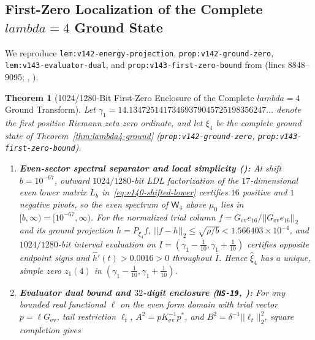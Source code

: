 \documentclass[11pt]{article}
\def\lambda{lambda}%
\def\norm#1{||#1||}%
\newtheorem{theorem}{Theorem}[section]
\theoremstyle{remark}
\newcommand{\norm}[1]{\left\lVert #1\right\rVert}
\begin{document}
\subsection{First-Zero Localization of the Complete \texorpdfstring{$\lambda = 4$}{lambda = 4} Ground State}
We reproduce \texttt{lem:v142-\allowbreak energy-\allowbreak projection}, \texttt{prop:v142-\allowbreak ground-\allowbreak zero}, \texttt{lem:v143-\allowbreak evaluator-\allowbreak dual}, and \texttt{prop:v143-\allowbreak first-\allowbreak zero-\allowbreak bound} from  (lines 8848--9095; , ).

\begin{theorem}[1024/1280-Bit First-Zero Enclosure of the Complete $\lambda = 4$ Ground Transform]
\label{thm:first-zero-enclosure}
Let $\gamma_1 = 14.13472514173469379045725198356247\dots$ denote the first positive Riemann zeta zero ordinate, and let $\xi_4$ be the complete ground state of Theorem~\ref{thm:lambda4-ground} (\texttt{prop:v142-ground-zero}, \texttt{prop:v143-first-zero-bound}).
\begin{enumerate}[label=(\alph*)]
  \item \textbf{Even-sector spectral separator and local simplicity ():} At shift $b = 10^{-67}$, outward $1024/1280$-bit LDL factorization of the $17$-dimensional even lower matrix $L_b$ in~\eqref{eq:v140-shifted-lower} certifies $16$ positive and $1$ negative pivots, so the even spectrum of $\mathsf{W}_4$ above $\mu_0$ lies in $[b, \infty) = [10^{-67}, \infty)$. For the normalized trial column $f = G_{\mathrm{ev}}e_{16}/\norm{G_{\mathrm{ev}}e_{16}}_2$ and its ground projection $h = P_{\xi_4}f$, $\norm{f - h}_2 \le \sqrt{\rho/b} < 1.566403 \times 10^{-4}$, and $1024/1280$-bit interval evaluation on $I = (\gamma_1 - \tfrac{1}{10}, \gamma_1 + \tfrac{1}{10})$ certifies opposite endpoint signs and $\widehat{h}'(t) > 0.0016 > 0$ throughout $\overline{I}$. Hence $\widehat{\xi}_4$ has a unique, simple zero $z_1(4)$ in $(\gamma_1 - \tfrac{1}{10}, \gamma_1 + \tfrac{1}{10})$.
  \item \textbf{Evaluator dual bound and $32$-digit enclosure (\texttt{NS-19}, ):} For any bounded real functional $\ell$ on the even form domain with trial vector $p = \ell G_{\mathrm{ev}}$, tail restriction $\ell_t$, $A^2 = p K_{\mathrm{ev}}^{-1} p^*$, and $B^2 = \delta^{-1}\norm{\ell_t}_2^2$, square completion gives
  \begin{equation}\label{eq:v143-dual-bound}

\end{equation}
\end{enumerate}
\end{theorem}
\end{document}
